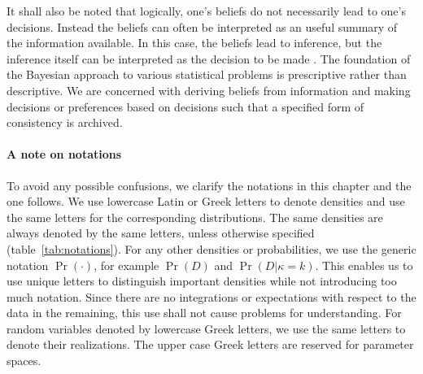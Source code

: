It shall also be noted that logically, one's beliefs do not necessarily lead
to one's decisions. Instead the beliefs can often be interpreted as an useful
summary of the information available. In this case, the beliefs lead to
inference, but the inference itself can be interpreted as the decision to be
made \parencite[][chap.~1]{Lehmann2005}. The foundation of the Bayesian
approach to various statistical problems is prescriptive rather than
descriptive. We are concerned with deriving beliefs from information and
making decisions or preferences based on decisions such that a specified form
of consistency is archived.

\paragraph{A note on notations} To avoid any possible confusions, we clarify
the notations in this chapter and the one follows. We use lowercase Latin or
Greek letters to denote densities and use the same letters for the
corresponding distributions. The same densities are always denoted by the same
letters, unless otherwise specified (table~\ref{tab:notations}). For any other
densities or probabilities, we use the generic notation $\Pr(\cdot)$, for
example $\Pr(D)$ and $\Pr(D|\kappa=k)$. This enables us to use unique letters
to distinguish important densities while not introducing too much notation.
Since there are no integrations or expectations with respect to the data in
the remaining, this use shall not cause problems for understanding. For random
variables denoted by lowercase Greek letters, we use the same letters to
denote their realizations. The upper case Greek letters are reserved for
parameter spaces.

